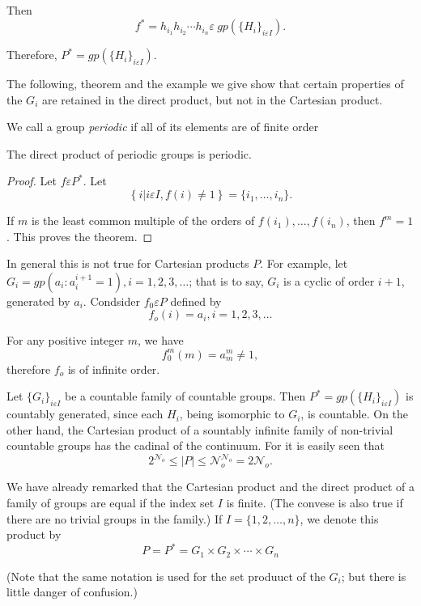 Then
$$
f^* = h_{i_1} h_{i_2} \cdots h_{i_n} \varepsilon ~gp ( \{ H_i \}_{i \varepsilon I}).
$$

Therefore, $P^*= gp ( \{ H_i\}_{i \varepsilon I})$.

The following, theorem and the example we give show that certain
properties of the $G_i$ are retained in the direct product, but not in
the Cartesian product. 

We call a group \textit{ periodic } if all of its elements are of finite order
\setcounter{Theorem}{0}
\begin{Theorem} %
  The direct product of periodic groups is periodic.
\end{Theorem}

\begin{proof}
  Let $f \varepsilon P^*$. Let 
  $$
  \left\{ i \bigg| i \varepsilon I, f(i) \neq 1 \right\}= \bigg\{ i_1,
  \ldots,  i_n \bigg\}. 
  $$

  If $m$ is the least common multiple of the orders of $f(i_1), \ldots, 
  f(i_n)$, then $f^m=1$. This proves the theorem. 
\end{proof}

In general this is not true for Cartesian products $P$. For example,
let $G_i= gp(a_i : a^{i+1}_i =1), i=1, 2, 3, \ldots $; that is to say,
$G_i$ is a cyclic of order $i+1$, generated by $a_i$. Condsider $f_0
\varepsilon P$ defined by   
$$
f_o(i) = a_i, i = 1,2,3, \ldots
$$

For any positive integer $m$, we have 
$$
f^m_0(m)= a_m^m \neq 1,
$$
therefore $f_o$ is of infinite order.

Let $\{ G_i \}_{i \varepsilon I}$ be a countable family of countable
groups. Then $P^* = gp( \{ H_i\}_{i \varepsilon I})$ is countably
generated, since each $H_i$, being isomorphic to $G_i$, is
countable. On the other hand, the Cartesian product of a sountably
infinite family of non-trivial countable groups has the cadinal of the
continuum. For it is easily seen that  
$$
2^ {\mathscr{N}_o} \le |P| \le  \mathscr{N}_o^{\mathscr{N}_o}=
2{\mathscr{N}_o}.  
$$

We have already remarked that the Cartesian product and the direct
product of a family of groups are equal if the index set $I$ is
finite. (The convese is also true if there are no trivial groups in
the family.) If $I= \{ 1,2, \ldots,  n\}$, we denote this product by   
$$
P = P^* = G_1 \times G_2 \times \cdots \times G_n
$$

(Note that the same notation is used for the set produuct of the
$G_i$; but there is little danger of confusion.) 

